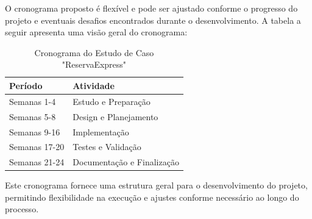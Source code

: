 O cronograma proposto é flexível e pode ser ajustado conforme o progresso do projeto e eventuais desafios encontrados durante o desenvolvimento. A tabela a seguir apresenta uma visão geral do cronograma:

\begin{table}[h]
    \centering
    \begin{tabular}{|p{4cm}|p{8cm}|}
        \hline
        \textbf{Período} & \textbf{Atividade} \\
        \hline
        Semanas 1-4 & Estudo e Preparação \\
        \hline
        Semanas 5-8 & Design e Planejamento \\
        \hline
        Semanas 9-16 & Implementação \\
        \hline
        Semanas 17-20 & Testes e Validação \\
        \hline
        Semanas 21-24 & Documentação e Finalização \\
        \hline
    \end{tabular}
    \caption{Cronograma do Estudo de Caso "ReservaExpress"}
    \label{tab:cronograma}
\end{table}

Este cronograma fornece uma estrutura geral para o desenvolvimento do projeto, permitindo flexibilidade na execução e ajustes conforme necessário ao longo do processo.
